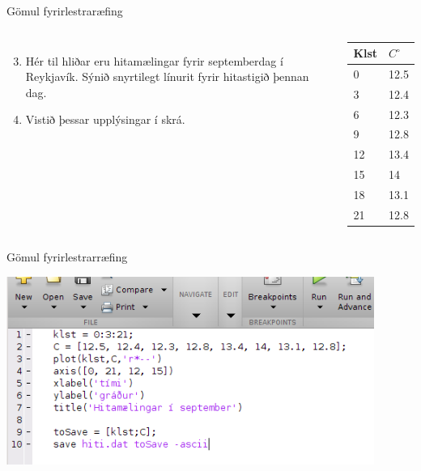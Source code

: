 \documentclass{beamer}
\begin{document}
\begin{frame}{Gömul fyrirlestraræfing}
\begin{columns}
\begin{enumerate}
\setcounter{enumi}{2}
 \item Hér til hliðar eru hitamælingar fyrir septemberdag í Reykjavík. Sýnið snyrtilegt línurit fyrir hitastigið þennan dag.
 \item Vistið þessar upplýsingar í skrá.
\end{enumerate}
\begin{center}
\begin{tabular}{ll}
\toprule
Klst&$C^\circ$\\
\midrule
0&12.5\\
3&12.4\\
6&12.3\\
9&12.8\\
12&13.4\\
15&14\\
18&13.1\\
21&12.8\\
\bottomrule
\end{tabular}
\end{center}
\end{columns}
\end{frame}

\begin{frame}[fragile]{Gömul fyrirlestrarræfing}
\begin{center}
\includegraphics[width=0.9\textwidth]{Pics/septemberhitiscript}
\end{center}
\end{frame}
\end{document}
